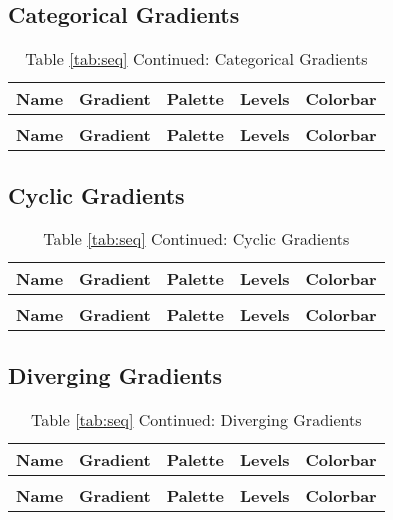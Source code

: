 \documentclass[a4paper]{article}
\begin{document}
\subsection{Categorical Gradients}
\renewcommand{\arraystretch}{2}
\begin{longtable}{p{}p{}p{}p{}p{}}
	\caption{Categorical Gradients} \label{tab:cat}                                            \\
	\hline
	\textbf{Name} & \textbf{Gradient} & \textbf{Palette} & \textbf{Levels} & \textbf{Colorbar} \\ \hline \endfirsthead
	\caption*{Table \ref{tab:seq} Continued: Categorical Gradients}                            \\
	\hline
	\textbf{Name} & \textbf{Gradient} & \textbf{Palette} & \textbf{Levels} & \textbf{Colorbar} \\ \hline \endhead
	
\end{longtable}
\newpage
\subsection{Cyclic Gradients}
\renewcommand{\arraystretch}{2}
\begin{longtable}{p{}p{}p{}p{}p{}}
	\caption{Cyclic Gradients} \label{tab:cyc}                                                 \\
	\hline
	\textbf{Name} & \textbf{Gradient} & \textbf{Palette} & \textbf{Levels} & \textbf{Colorbar} \\ \hline \endfirsthead
	\caption*{Table \ref{tab:seq} Continued: Cyclic Gradients}                                 \\
	\hline
	\textbf{Name} & \textbf{Gradient} & \textbf{Palette} & \textbf{Levels} & \textbf{Colorbar} \\ \hline \endhead
	
\end{longtable}
\newpage
\subsection{Diverging Gradients}
\renewcommand{\arraystretch}{2}
\begin{longtable}{p{}p{}p{}p{}p{}}
	\caption{Diverging Gradients} \label{tab:div}                                              \\
	\hline
	\textbf{Name} & \textbf{Gradient} & \textbf{Palette} & \textbf{Levels} & \textbf{Colorbar} \\ \hline \endfirsthead
	\caption*{Table \ref{tab:seq} Continued: Diverging Gradients}                              \\
	\hline
	\textbf{Name} & \textbf{Gradient} & \textbf{Palette} & \textbf{Levels} & \textbf{Colorbar} \\ \hline \endhead
	
\end{longtable}
\newpage
\end{document}
